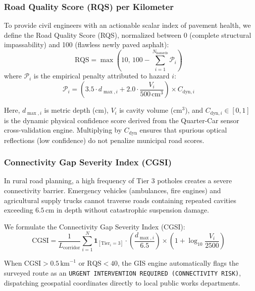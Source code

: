 \subsubsection{Road Quality Score (RQS) per Kilometer}
To provide civil engineers with an actionable scalar index of pavement health, we define the Road Quality Score (RQS), normalized between 0 (complete structural impassability) and 100 (flawless newly paved asphalt):
\begin{equation}
    \text{RQS} = \max\left( 10, \, 100 - \sum_{i=1}^{N_{\text{hazards}}} \mathcal{P}_i \right)
\end{equation}
where $\mathcal{P}_i$ is the empirical penalty attributed to hazard $i$:
\begin{equation}
    \mathcal{P}_i = \left( 3.5 \cdot d_{\max, i} + 2.0 \cdot \frac{V_i}{500\,\text{cm}^3} \right) \times C_{\text{dyn}, i}
\end{equation}

Here, $d_{\max, i}$ is metric depth (cm), $V_i$ is cavity volume ($\text{cm}^3$), and $C_{\text{dyn}, i} \in [0, 1]$ is the dynamic physical confidence score derived from the Quarter-Car sensor cross-validation engine. Multiplying by $C_{\text{dyn}}$ ensures that spurious optical reflections (low confidence) do not penalize municipal road scores.

\subsubsection{Connectivity Gap Severity Index (CGSI)}
In rural road planning, a high frequency of Tier 3 potholes creates a severe connectivity barrier. Emergency vehicles (ambulances, fire engines) and agricultural supply trucks cannot traverse roads containing repeated cavities exceeding $6.5\,\text{cm}$ in depth without catastrophic suspension damage.

We formulate the Connectivity Gap Severity Index (CGSI):
\begin{equation}
    \text{CGSI} = \frac{1}{L_{\text{corridor}}} \sum_{i=1}^{N} \mathbf{1}_{[\text{Tier}_i = 3]} \cdot \left(\frac{d_{\max, i}}{6.5}\right) \times \left(1 + \log_{10} \frac{V_i}{2500}\right)
\end{equation}

When $\text{CGSI} > 0.5\,\text{km}^{-1}$ or $\text{RQS} < 40$, the GIS engine automatically flags the surveyed route as an \texttt{URGENT INTERVENTION REQUIRED (CONNECTIVITY RISK)}, dispatching geospatial coordinates directly to local public works departments.

